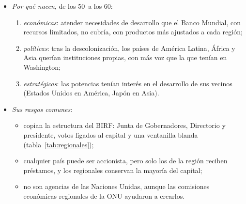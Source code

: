 \documentclass[11pt]{article}
\begin{document}
\begin{itemize}
\item \emph{Por qué nacen}, de los 50~a los 60:
  \begin{enumerate}
  \item \emph{económicas}: atender necesidades de desarrollo que el Banco Mundial, con recursos limitados, no cubría, con productos más ajustados a cada región;
  \item \emph{políticas}: tras la descolonización, los países de América Latina, África y Asia querían instituciones propias, con más voz que la que tenían en Washington;
  \item \emph{estratégicas}: las potencias tenían interés en el desarrollo de sus vecinos (Estados Unidos en América, Japón en Asia).
  \end{enumerate}
\item \emph{Sus rasgos comunes}:
  \begin{itemize}
  \item copian la estructura del BIRF: Junta de Gobernadores, Directorio y presidente, votos ligados al capital y una ventanilla blanda (tabla~\ref{tab:regionales});
  \item cualquier país puede ser accionista, pero solo los de la región reciben préstamos, y los regionales conservan la mayoría del capital;
  \item no son agencias de las Naciones Unidas, aunque las comisiones económicas regionales de la ONU ayudaron a crearlos.
  \end{itemize}
\end{itemize}
\end{document}
